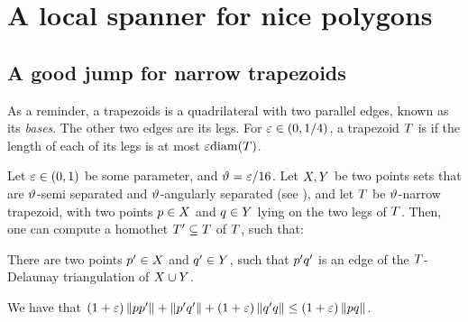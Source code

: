 \documentclass[12pt]{article}%
\begin{document}
\HERE



\newcommand{\Trap}{\Mh{T}}%

\section{A local spanner for nice polygons}

\subsection{A good jump for narrow trapezoids}

As a reminder, a trapezoids is a quadrilateral with two parallel
edges, known as its \emph{bases}. The other two edges are its legs.
For $\varepsilon \in (0,1/4)$, a trapezoid $\Trap$ is 
if the length of each of its legs is at most $\eps \diamX{\Trap}$.


\begin{lemma}
    Let $\varepsilon \in (0,1)$ be some parameter, and $\vartheta = \varepsilon/16$.
    Let $X,Y$ be two points sets that are $\vartheta$-semi separated
    and $\vartheta$-angularly separated (see ),
    and let $\Trap$ be $\vartheta$-narrow trapezoid, with two points
    $p \in X$ and $q \in Y$ lying on the two legs of
    $\Trap$. Then, one can compute a homothet $\Trap' \subseteq \Trap$
    of $\Trap$, such that:
    \begin{compactenumI}
        \item There are two points $p' \in X$ and $q' \in Y$,
        such that $p'q'$ is an edge of the $\Trap$-Delaunay
        triangulation of $X \cup Y$.

        \item We have that
        $(1+\varepsilon)\left\| p p' \right\| + \left\| p' q' \right\| + (1+\varepsilon)
        \left\| q' q \right\| \leq (1+\varepsilon) \left\| p q \right\|$.
    \end{compactenumI}
\end{lemma}
\end{document}
